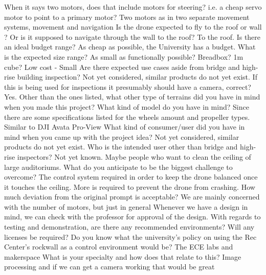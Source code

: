\documentclass[12pt]{article}
\begin{document}
                \qna
                {When it says two motors, does that include motors for steering? i.e. a cheap servo motor to point to a primary motor?}
                {Two motors as in two separate movement systems, movement and navigation}
                \qna
                {Is the drone expected to fly to the roof or wall ? Or is it supposed to navigate through the wall to the roof?}
                {To the roof.}
                \qna
                {Is there an ideal budget range?}
                {As cheap as possible, the University has a budget.}
                \qna
                {What is the expected size range? As small as functionally possible? Breadbox? 1m cube?}
                {Low cost -\> Small}
                \qna
                {Are there expected use cases aside from bridge and high-rise building inspection?}
                {Not yet considered, similar products do not yet exist.}
                \qna
                {If this is being used for inspections it presumably should have a camera, correct?}
                {Yes.}
                \qna
                {Other than the ones listed, what other type of terrains did you have in mind when you made this project?}
                {}
                \qna
                {What kind of model do you have in mind? Since there are some specifications listed for the wheels amount and propeller types.}
                {Similar to DJI Avata Pro-View}
                \qna
                {What kind of consumer/user did you have in mind when you came up with the project idea?}
                {Not yet considered, similar products do not yet exist.}
                \qna
                {Who is the intended user other than bridge and high-rise inspectors?}
                {Not yet known. Maybe people who want to clean the ceiling of large auditoriums.}
                \qna
                {What do you anticipate to be the biggest challenge to overcome?}
                {The control system required in order to keep the drone balanced once it touches the ceiling. More is required to prevent the drone from crashing.}
                \qna
                {How much deviation from the original prompt is acceptable? We are mainly concerned with the number of motors, but just in general}
                {Whenever we have a design in mind, we can check with the professor for approval of the design.}
                \qna
                {With regards to testing and demonstration, are there any recommended environments? Will any licenses be required? Do you know what the university's policy on using the Rec Center's rockwall as a control environment would be?}
                {The ECE labs and makerspace}
                \qna
                {What is your specialty and how does that relate to this?}
                {Image processing and if we can get a camera working that would be great}
\end{document}

